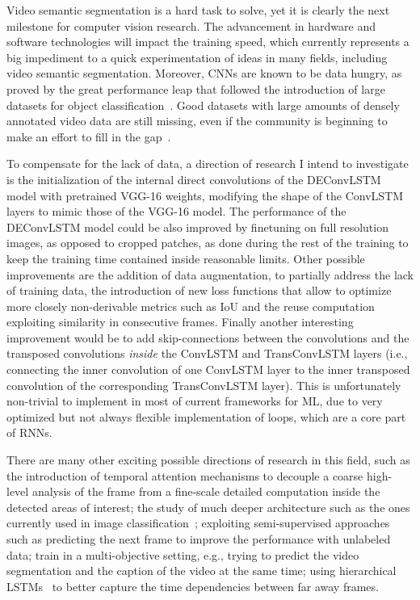 Video semantic segmentation is a hard task to solve, yet it is clearly the next
milestone for computer vision research. The advancement in hardware and
software technologies will impact the training speed, which currently
represents a big impediment to a quick experimentation of ideas in many fields,
including video semantic segmentation. Moreover, CNNs are known to be data
hungry, as proved by the great performance leap that followed the introduction
of large datasets for object classification~\citep{ILSVRCarxiv14}. Good
datasets with large amounts of densely annotated video data are still missing,
even if the community is beginning to make an effort to fill in the
gap~\citep[see~e.g.,~][]{Perazzi2016,lin2014microsoft}.

To compensate for the lack of data, a direction of research I intend to
investigate is the initialization of the internal direct convolutions of the
DEConvLSTM model with pretrained VGG-16 weights, modifying the shape of the
ConvLSTM layers to mimic those of the VGG-16 model. The performance of the
DEConvLSTM model could be also improved by finetuning on full resolution
images, as opposed to cropped patches, as done during the rest of the training
to keep the training time contained inside reasonable limits. Other possible
improvements are the addition of data augmentation, to partially address the
lack of training data, the introduction of new loss functions that allow to
optimize more closely non-derivable metrics such as IoU and the reuse
computation exploiting similarity in consecutive frames. Finally another
interesting improvement would be to add skip-connections between the
convolutions and the transposed convolutions \emph{inside} the ConvLSTM and
TransConvLSTM layers (i.e., connecting the inner convolution of one ConvLSTM
layer to the inner transposed convolution of the corresponding TransConvLSTM
layer). This is unfortunately non-trivial to implement in most of current
frameworks for ML, due to very optimized but not always flexible implementation
of loops, which are a core part of RNNs.

There are many other exciting possible directions of research in this field,
such as the introduction of temporal attention mechanisms to decouple a coarse
high-level analysis of the frame from a fine-scale detailed computation inside
the detected areas of interest; the study of much deeper architecture such as
the ones currently used in image classification~\citep[see, e.g.,~][]{
szegedy2016inception,he2015deep}; exploiting semi-supervised approaches such as
predicting the next frame to improve the performance with unlabeled data; train
in a multi-objective setting, e.g., trying to predict the video segmentation
and the caption of the video at the same time; using hierarchical
LSTMs~\citep[see, e.g.,~][]{Koutnik-et-al-ICML2014, chung2016hierarchical} to
better capture the time dependencies between far away frames.
